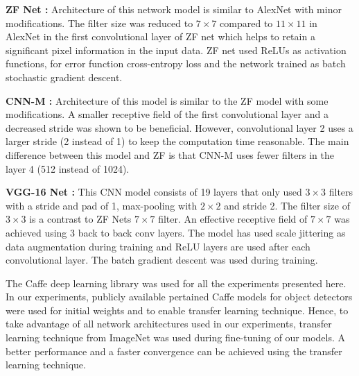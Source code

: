 \documentclass[conference]{IEEEtran}       %
\begin{document}
{\bf ZF Net \cite{DBLP:journals/corr/ZeilerF13}:} Architecture of this network model is similar to AlexNet with minor modifications.  The filter size was reduced to $7 \times 7$  compared to $11 \times 11$ in AlexNet in the first convolutional layer of ZF net which helps to retain a significant pixel information in the input data. ZF net used ReLUs as activation functions, for error function cross-entropy loss and the network trained as batch stochastic gradient descent.

{\bf CNN-M \cite{Chatfield14}:} Architecture of this model is similar to the ZF model with some modifications. A smaller receptive field of the first convolutional layer and a decreased stride was shown to be beneficial. However, convolutional layer 2 uses a larger stride (2 instead of 1) to keep the computation time reasonable. The main difference between this model and  ZF is that CNN-M uses fewer filters in the layer 4 (512 instead of 1024).

{\bf VGG-16 Net \cite{Simonyan14c}:} This CNN model consists of 19 layers that only used $3 \times 3$ filters with a stride and pad of 1,  max-pooling with $2 \times 2$  and stride 2. The filter size of $3 \times 3$ is a contrast to ZF Nets $7 \times 7$ filter. An effective receptive field of $7 \times 7$ was achieved using 3 back to back conv layers. The model has used scale jittering as data augmentation during training and ReLU layers are used after each convolutional layer. The batch gradient descent was used during training.

The Caffe deep learning library \cite{jia2014caffe} was used for all the experiments presented here. In our experiments, publicly available pertained Caffe models for object detectors were used for initial weights and to enable transfer learning technique. Hence, to take advantage of all network architectures used in our experiments, transfer learning technique from ImageNet \cite{ILSVRC15} was used during fine-tuning of our models. A better performance and a faster convergence can be achieved using the transfer learning technique.
\end{document}
